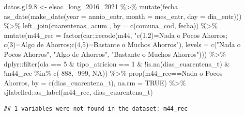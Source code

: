\documentclass[
  12pt,
]{book}
\newenvironment{Shaded}{\begin{snugshade}}{\end{snugshade}}
\newcommand{\AttributeTok}[1]{\textcolor[rgb]{0.77,0.63,0.00}{#1}}
\newcommand{\ConstantTok}[1]{\textcolor[rgb]{0.00,0.00,0.00}{#1}}
\newcommand{\DecValTok}[1]{\textcolor[rgb]{0.00,0.00,0.81}{#1}}
\newcommand{\FloatTok}[1]{\textcolor[rgb]{0.00,0.00,0.81}{#1}}
\newcommand{\FunctionTok}[1]{\textcolor[rgb]{0.00,0.00,0.00}{#1}}
\newcommand{\NormalTok}[1]{#1}
\newcommand{\OtherTok}[1]{\textcolor[rgb]{0.56,0.35,0.01}{#1}}
\newcommand{\SpecialCharTok}[1]{\textcolor[rgb]{0.00,0.00,0.00}{#1}}
\newcommand{\StringTok}[1]{\textcolor[rgb]{0.31,0.60,0.02}{#1}}
\begin{document}
\begin{Shaded}
\begin{Highlighting}[]
\NormalTok{datos.g19}\FloatTok{.8} \OtherTok{\textless{}{-}}\NormalTok{ elsoc\_long\_2016\_2021 }\SpecialCharTok{\%\textgreater{}\%} 
  \FunctionTok{mutate}\NormalTok{(}\AttributeTok{fecha =} \FunctionTok{as\_date}\NormalTok{(}\FunctionTok{make\_date}\NormalTok{(}\AttributeTok{year =}\NormalTok{ annio\_entr, }\AttributeTok{month =}\NormalTok{ mes\_entr, }\AttributeTok{day =}\NormalTok{ dia\_entr))) }\SpecialCharTok{\%\textgreater{}\%} 
  \FunctionTok{left\_join}\NormalTok{(cuarentenas\_acum , }\AttributeTok{by =} \FunctionTok{c}\NormalTok{(}\StringTok{\textquotesingle{}comuna\_cod\textquotesingle{}}\NormalTok{, }\StringTok{\textquotesingle{}fecha\textquotesingle{}}\NormalTok{)) }\SpecialCharTok{\%\textgreater{}\%} 
  \FunctionTok{mutate}\NormalTok{(}\AttributeTok{m44\_rec =} \FunctionTok{factor}\NormalTok{(car}\SpecialCharTok{::}\FunctionTok{recode}\NormalTok{(m44, }\StringTok{"c(1,2)=\textquotesingle{}Nada o Pocos Ahorros\textquotesingle{}; c(3)=\textquotesingle{}Algo de Ahorros\textquotesingle{};c(4,5)=\textquotesingle{}Bastante o Muchos Ahorros\textquotesingle{}"}\NormalTok{), }\AttributeTok{levels =} \FunctionTok{c}\NormalTok{(}\StringTok{"Nada o Pocos Ahorros"}\NormalTok{, }\StringTok{"Algo de Ahorros"}\NormalTok{, }\StringTok{"Bastante o Muchos Ahorros"}\NormalTok{))) }\SpecialCharTok{\%\textgreater{}\%}
\NormalTok{  dplyr}\SpecialCharTok{::}\FunctionTok{filter}\NormalTok{(ola }\SpecialCharTok{==} \DecValTok{5} \SpecialCharTok{\&}\NormalTok{ tipo\_atricion }\SpecialCharTok{==} \DecValTok{1} \SpecialCharTok{\&} \SpecialCharTok{!}\FunctionTok{is.na}\NormalTok{(dias\_cuarentena\_t) }\SpecialCharTok{\&} \SpecialCharTok{!}\NormalTok{m44\_rec }\SpecialCharTok{\%in\%} \FunctionTok{c}\NormalTok{(}\SpecialCharTok{{-}}\DecValTok{888}\NormalTok{, }\SpecialCharTok{{-}}\DecValTok{999}\NormalTok{, }\ConstantTok{NA}\NormalTok{)) }\SpecialCharTok{\%\textgreater{}\%} 
  \FunctionTok{prop}\NormalTok{(m44\_rec}\SpecialCharTok{==}\StringTok{\textquotesingle{}Nada o Pocos Ahorros\textquotesingle{}}\NormalTok{, }\AttributeTok{by =} \FunctionTok{c}\NormalTok{(dias\_cuarentena\_t), }\AttributeTok{na.rm =} \ConstantTok{TRUE}\NormalTok{) }\SpecialCharTok{\%\textgreater{}\%} 
\NormalTok{  sjlabelled}\SpecialCharTok{::}\FunctionTok{as\_label}\NormalTok{(m44\_rec, dias\_cuarentena\_t) }
\end{Highlighting}
\end{Shaded}

\begin{verbatim}
## 1 variables were not found in the dataset: m44_rec
\end{verbatim}
\end{document}
